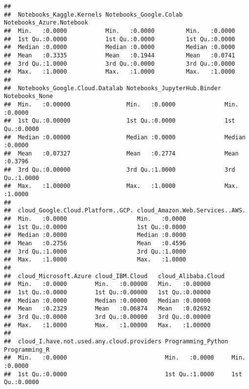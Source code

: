 \documentclass[
]{article}
\begin{document}
\begin{verbatim}
##                                                                              
##  Notebooks_Kaggle.Kernels Notebooks_Google.Colab Notebooks_Azure.Notebook
##  Min.   :0.0000           Min.   :0.0000         Min.   :0.0000          
##  1st Qu.:0.0000           1st Qu.:0.0000         1st Qu.:0.0000          
##  Median :0.0000           Median :0.0000         Median :0.0000          
##  Mean   :0.3335           Mean   :0.1944         Mean   :0.0741          
##  3rd Qu.:1.0000           3rd Qu.:0.0000         3rd Qu.:0.0000          
##  Max.   :1.0000           Max.   :1.0000         Max.   :1.0000          
##                                                                          
##  Notebooks_Google.Cloud.Datalab Notebooks_JupyterHub.Binder Notebooks_None  
##  Min.   :0.00000                Min.   :0.0000              Min.   :0.0000  
##  1st Qu.:0.00000                1st Qu.:0.0000              1st Qu.:0.0000  
##  Median :0.00000                Median :0.0000              Median :0.0000  
##  Mean   :0.07327                Mean   :0.2774              Mean   :0.3796  
##  3rd Qu.:0.00000                3rd Qu.:1.0000              3rd Qu.:1.0000  
##  Max.   :1.00000                Max.   :1.0000              Max.   :1.0000  
##                                                                             
##  cloud_Google.Cloud.Platform..GCP. cloud_Amazon.Web.Services..AWS.
##  Min.   :0.0000                    Min.   :0.0000                 
##  1st Qu.:0.0000                    1st Qu.:0.0000                 
##  Median :0.0000                    Median :0.0000                 
##  Mean   :0.2756                    Mean   :0.4596                 
##  3rd Qu.:1.0000                    3rd Qu.:1.0000                 
##  Max.   :1.0000                    Max.   :1.0000                 
##                                                                   
##  cloud_Microsoft.Azure cloud_IBM.Cloud   cloud_Alibaba.Cloud
##  Min.   :0.0000        Min.   :0.00000   Min.   :0.00000    
##  1st Qu.:0.0000        1st Qu.:0.00000   1st Qu.:0.00000    
##  Median :0.0000        Median :0.00000   Median :0.00000    
##  Mean   :0.2329        Mean   :0.06874   Mean   :0.02692    
##  3rd Qu.:0.0000        3rd Qu.:0.00000   3rd Qu.:0.00000    
##  Max.   :1.0000        Max.   :1.00000   Max.   :1.00000    
##                                                             
##  cloud_I.have.not.used.any.cloud.providers Programming_Python Programming_R   
##  Min.   :0.0000                            Min.   :0.0000     Min.   :0.0000  
##  1st Qu.:0.0000                            1st Qu.:1.0000     1st Qu.:0.0000  

\end{verbatim}
\end{document}
